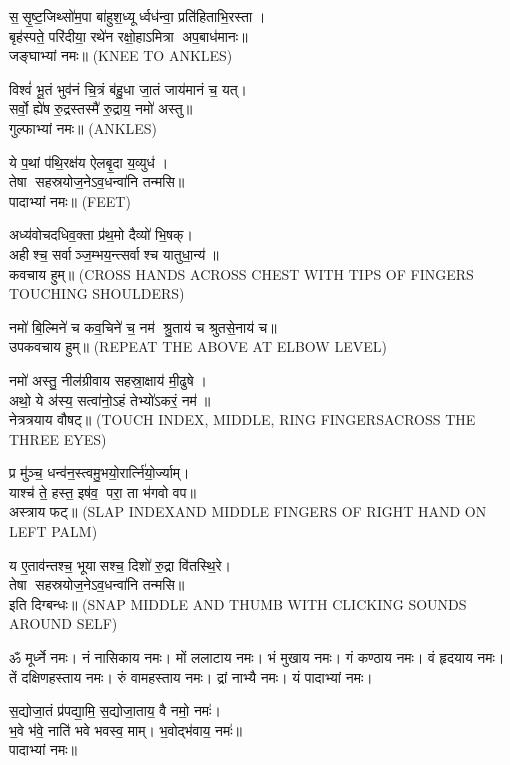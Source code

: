 स॒सृ॒ष्ट॒जिथ्सो॑म॒पा बा॑हुश॒ध्यूर्ध्वध॑न्वा॒ प्रति॑हिताभि॒रस्ता।\\
बृह॑स्पते॒ परि॑दीया॒ रथे॑न रक्षो॒हाऽमित्रा अप॒बाध॑मानः॥\\
जङ्घाभ्यां नमः॥ {\scriptsize (KNEE TO ANKLES)}

विश्वं॑ भू॒तं भुव॑नं चि॒त्रं ब॑हु॒धा जा॒तं जाय॑मानं च॒ यत्।\\
सर्वो॒ ह्ये॑ष रु॒द्रस्तस्मै॑ रु॒द्राय॒ नमो॑ अस्तु॥\\
गुल्फाभ्यां नमः॥ {\scriptsize (ANKLES)}

ये प॒थां प॑थि॒रक्ष॑य ऐलबृ॒दा य॒व्युध॑।\\
तेषा सहस्रयोज॒नेऽव॒धन्वा॑नि तन्मसि॥ \\
पादाभ्यां नमः॥ {\scriptsize (FEET)}


अध्य॑वोचदधिव॒क्ता प्र॑थ॒मो दैव्यो॑ भि॒षक्।\\
अहीश्च॒ सर्वाञ्ज॒म्भय॒न्त्सर्वाश्च यातुधा॒न्य॑॥\\
कवचाय हुम्॥ {\scriptsize (CROSS HANDS ACROSS CHEST WITH TIPS OF FINGERS TOUCHING SHOULDERS)}


नमो॑ बि॒ल्मिने॑ च कव॒चिने॑ च॒ नम॑ श्रु॒ताय॑ च श्रुतसे॒नाय॑ च॥\\
उपकवचाय हुम्॥ {\scriptsize (REPEAT THE ABOVE AT ELBOW LEVEL)}

नमो॑ अस्तु॒ नील॑ग्रीवाय सहस्रा॒क्षाय॑ मी॒ढुषे। \\
अथो॒ ये अ॑स्य॒ सत्वा॑नो॒ऽहं तेभ्यो॑ऽकरं॒ नम॑॥ \\
नेत्रत्रयाय वौषट्॥ {\scriptsize (TOUCH INDEX, MIDDLE, RING FINGERSACROSS THE THREE EYES)}


प्र मु॑ञ्च॒ धन्व॑न॒स्त्वमु॒भयो॒रार्त्नि॑यो॒र्ज्याम्।\\
याश्च॑ ते॒ हस्त॒ इष॑व॒ परा॒ ता भ॑गवो वप॥\\ 
अस्त्राय फट्॥ {\scriptsize (SLAP INDEXAND MIDDLE FINGERS OF RIGHT HAND ON LEFT PALM)}

य ए॒ताव॑न्तश्च॒ भूयासश्च॒ दिशो॑ रु॒द्रा वि॑तस्थि॒रे।\\
 तेषा सहस्रयोज॒नेऽव॒धन्वा॑नि तन्मसि॥ \\
इति दिग्बन्धः॥ {\scriptsize (SNAP MIDDLE AND THUMB WITH CLICKING SOUNDS AROUND SELF)}

{\small \closesection}

ॐ मूर्ध्ने नमः। नं नासिकाय नमः। मों ललाटाय नमः। भं मुखाय नमः। गं कण्ठाय नमः। वं हृदयाय नमः। तें दक्षिणहस्ताय नमः। रुं वामहस्ताय नमः। द्रां नाभ्यै नमः। यं पादाभ्यां नमः।

स॒द्योजा॒तं प्र॑पद्या॒मि॒ स॒द्योजा॒ताय॒ वै नमो॒ नमः॑।\\
भ॒वे भ॑वे॒ नाति॑ भवे भवस्व॒ माम्। भ॒वोद्भ॑वाय॒ नमः॑॥ \\
पादाभ्यां नमः॥

